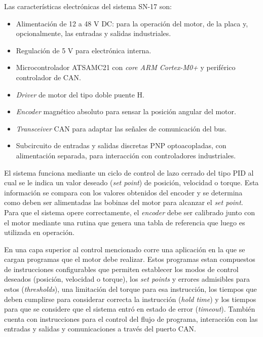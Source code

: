 
Las características electrónicas del sistema SN-17 son:

\begin{itemize}
	\item Alimentación de 12 a 48 V DC: para la operación del motor, de la placa y, opcionalmente, las entradas y salidas industriales.
	\item Regulación de 5 V para electrónica interna.
	\item Microcontrolador ATSAMC21\citep{web_ATSAMC21G18A} con \textit{core ARM Cortex-M0+} y periférico controlador de CAN.
	\item \textit{Driver} de motor del tipo doble puente H\citep{web_A4954}.
	\item \textit{Encoder} magnético absoluto\citep{web_AS5047D} para sensar la posición angular del motor.
	\item \textit{Transceiver} CAN para adaptar las señales de comunicación del bus.
	\item Subcircuito de entradas y salidas discretas PNP optoacopladas\citep{web_optoacopladores_LTV}, con alimentación separada, para interacción con controladores industriales.
\end{itemize}

El sistema funciona mediante un ciclo de control de lazo cerrado del tipo PID\citep{paper_PID_steppers} al cual se le indica un valor deseado (\textit{set point}) de posición, velocidad o torque. Esta información se compara con los valores obtenidos del encoder y se determina como deben ser alimentadas las bobinas del motor para alcanzar el \textit{set point}. Para que el sistema opere correctamente, el \textit{encoder} debe ser calibrado junto con el motor mediante una rutina que genera una tabla de referencia que luego es utilizada en operación.

En una capa superior al control mencionado corre una aplicación en la que se cargan programas que el motor debe realizar. Estos programas estan compuestos de instrucciones configurables que permiten establecer los modos de control deseados (posición, velocidad o torque), los \textit{set points} y errores admisibles para estos (\textit{thresholds}), una limitación del torque para esa instrucción, los tiempos que deben cumplirse para considerar correcta la instrucción (\textit{hold time}) y los tiempos para que se considere que el sistema entró en estado de error (\textit{timeout}). También cuenta con instrucciones para el control del flujo de programa, interacción con las entradas y salidas y comunicaciones a través del puerto CAN.

